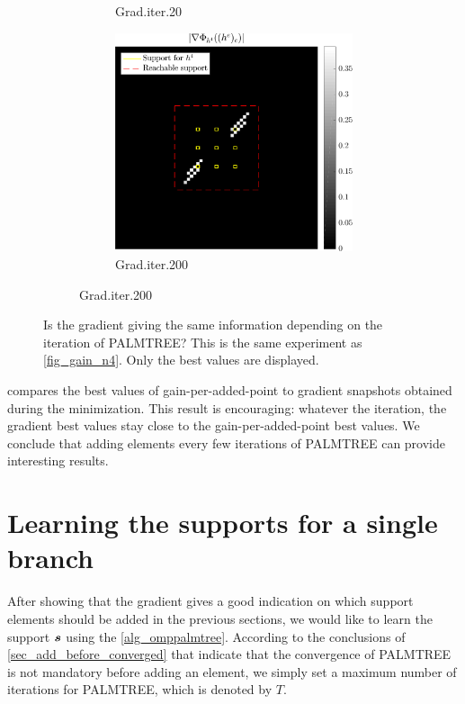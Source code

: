 \begin{figure}[!ht]
\begin{subfigure}[b]{0.49\linewidth}
\begin{subfigure}[b]{0.49\linewidth}
	\caption{Grad.\@ iter.\@ 20}
	\end{subfigure}
	\begin{subfigure}[b]{0.49\linewidth}\centering
	\includegraphics[width=\linewidth]{figures/xp_grad_iterations/xp_128x128_sc2_angl1_K3_S3_node4_iter200_partgrad4_bestvalues.pdf}
	\caption{Grad.\@ iter.\@ 200}
	\end{subfigure}
\end{subfigure}
\caption{Is the gradient giving the same information depending on the iteration of \ac{PALMTREE}? This is the same experiment as \cref{fig_gain_n4}. Only the best values are displayed.}\label{fig_iter_gain_vs_grad}
\end{figure}

\noindent
{} compares the best values of gain-per-added-point to gradient snapshots obtained during the minimization. This result is encouraging: whatever the iteration, the gradient best values stay close to the gain-per-added-point best values. We conclude that adding elements every few iterations of \ac{PALMTREE} can provide interesting results.

\FloatBarrier
\section{Learning the supports for a single branch}

After showing that the gradient gives a good indication on which support elements should be added in the previous sections, we would like to learn the support $\bm{s}$ using the \cref{alg_omppalmtree}. According to the conclusions of \cref{sec_add_before_converged} that indicate that the convergence of \ac{PALMTREE} is not mandatory before adding an element, we simply set a maximum number of iterations for \ac{PALMTREE}, which is denoted by $T$.

